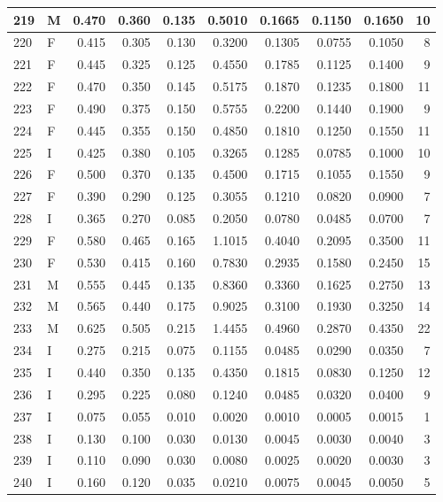 \documentclass[9pt,twocolumn,twoside,]{pnas-new}
\begin{document}
\begin{tabular}{l|l|r|r|r|r|r|r|r|r}
\hline
219 & M & 0.470 & 0.360 & 0.135 & 0.5010 & 0.1665 & 0.1150 & 0.1650 & 10\\
\hline
220 & F & 0.415 & 0.305 & 0.130 & 0.3200 & 0.1305 & 0.0755 & 0.1050 & 8\\
\hline
221 & F & 0.445 & 0.325 & 0.125 & 0.4550 & 0.1785 & 0.1125 & 0.1400 & 9\\
\hline
222 & F & 0.470 & 0.350 & 0.145 & 0.5175 & 0.1870 & 0.1235 & 0.1800 & 11\\
\hline
223 & F & 0.490 & 0.375 & 0.150 & 0.5755 & 0.2200 & 0.1440 & 0.1900 & 9\\
\hline
224 & F & 0.445 & 0.355 & 0.150 & 0.4850 & 0.1810 & 0.1250 & 0.1550 & 11\\
\hline
225 & I & 0.425 & 0.380 & 0.105 & 0.3265 & 0.1285 & 0.0785 & 0.1000 & 10\\
\hline
226 & F & 0.500 & 0.370 & 0.135 & 0.4500 & 0.1715 & 0.1055 & 0.1550 & 9\\
\hline
227 & F & 0.390 & 0.290 & 0.125 & 0.3055 & 0.1210 & 0.0820 & 0.0900 & 7\\
\hline
228 & I & 0.365 & 0.270 & 0.085 & 0.2050 & 0.0780 & 0.0485 & 0.0700 & 7\\
\hline
229 & F & 0.580 & 0.465 & 0.165 & 1.1015 & 0.4040 & 0.2095 & 0.3500 & 11\\
\hline
230 & F & 0.530 & 0.415 & 0.160 & 0.7830 & 0.2935 & 0.1580 & 0.2450 & 15\\
\hline
231 & M & 0.555 & 0.445 & 0.135 & 0.8360 & 0.3360 & 0.1625 & 0.2750 & 13\\
\hline
232 & M & 0.565 & 0.440 & 0.175 & 0.9025 & 0.3100 & 0.1930 & 0.3250 & 14\\
\hline
233 & M & 0.625 & 0.505 & 0.215 & 1.4455 & 0.4960 & 0.2870 & 0.4350 & 22\\
\hline
234 & I & 0.275 & 0.215 & 0.075 & 0.1155 & 0.0485 & 0.0290 & 0.0350 & 7\\
\hline
235 & I & 0.440 & 0.350 & 0.135 & 0.4350 & 0.1815 & 0.0830 & 0.1250 & 12\\
\hline
236 & I & 0.295 & 0.225 & 0.080 & 0.1240 & 0.0485 & 0.0320 & 0.0400 & 9\\
\hline
237 & I & 0.075 & 0.055 & 0.010 & 0.0020 & 0.0010 & 0.0005 & 0.0015 & 1\\
\hline
238 & I & 0.130 & 0.100 & 0.030 & 0.0130 & 0.0045 & 0.0030 & 0.0040 & 3\\
\hline
239 & I & 0.110 & 0.090 & 0.030 & 0.0080 & 0.0025 & 0.0020 & 0.0030 & 3\\
\hline
240 & I & 0.160 & 0.120 & 0.035 & 0.0210 & 0.0075 & 0.0045 & 0.0050 & 5\\

\end{tabular}
\end{document}
